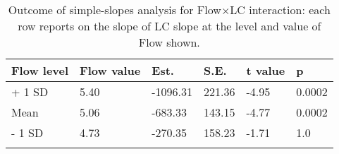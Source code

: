 
\begin{table}[!hb]
\centering
\caption{Outcome of simple-slopes analysis for Flow$\times$LC interaction: each row reports on the slope of LC slope at the level and value of Flow shown.}
\begin{tabular}{llllll}
\hline
Flow level & Flow value & Est. & S.E. & t value & p \\
\hline
+ 1 SD & 5.40 & -1096.31 & 221.36 & -4.95 & 0.0002 \\
Mean   & 5.06 &  -683.33 & 143.15 & -4.77 & 0.0002 \\
- 1 SD & 4.73 &  -270.35 & 158.23 & -1.71 & 1.0 \\
\hline
\label{tab:simpslopes}
\end{tabular}
\end{table}

%
